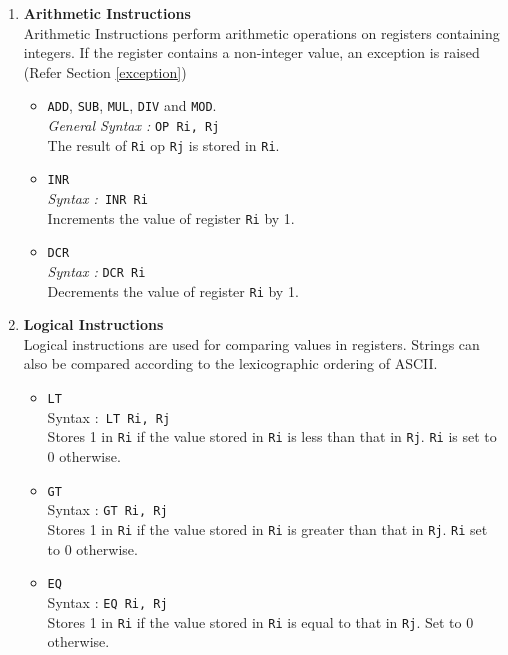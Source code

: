 \documentclass[11pt]{report}
\begin{document}
\begin{enumerate}
\item\textbf{ Arithmetic Instructions}
\\
Arithmetic Instructions perform arithmetic operations on registers containing integers. If the register contains a non-integer value, an exception is raised (Refer Section \ref{exception})
\begin{itemize}
\item \texttt{ADD}, \texttt{SUB}, \texttt{MUL}, \texttt{DIV} and \texttt{MOD}.\\
\textit{General Syntax :} \texttt{OP Ri, Rj}\\
The result of \texttt{Ri} op \texttt{Rj} is stored in \texttt{Ri}. 

\item \texttt{INR\\}
\textit{Syntax :}\texttt{ INR Ri}\\
Increments the value of register \texttt{Ri} by 1.  

\item  \texttt{DCR}\\
\textit{Syntax :} \texttt{DCR Ri}\\
Decrements the value of register \texttt{Ri} by 1. 

\end{itemize}


\item \textbf{Logical Instructions} \\
Logical instructions are used for comparing values in registers. Strings can also be compared according to the lexicographic ordering of ASCII.
\begin{itemize}

\item \texttt{LT}\\
Syntax :\texttt{ LT Ri, Rj}\\
Stores 1 in \texttt{Ri} if the value stored in \texttt{Ri} is less than that in \texttt{Rj}. \texttt{Ri} is set to 0 otherwise. 

\item \texttt{GT}\\
Syntax : \texttt{GT Ri, Rj}\\
Stores 1 in \texttt{Ri} if the value stored in \texttt{Ri} is greater than that in \texttt{Rj}. \texttt{Ri} set to 0 otherwise. 

\item \texttt{EQ}\\
Syntax : \texttt{EQ Ri, Rj}\\
Stores 1 in \texttt{Ri} if the value stored in \texttt{Ri} is equal to that in \texttt{Rj}. Set to 0 otherwise. 


\end{itemize}
\end{enumerate}
\end{document}
